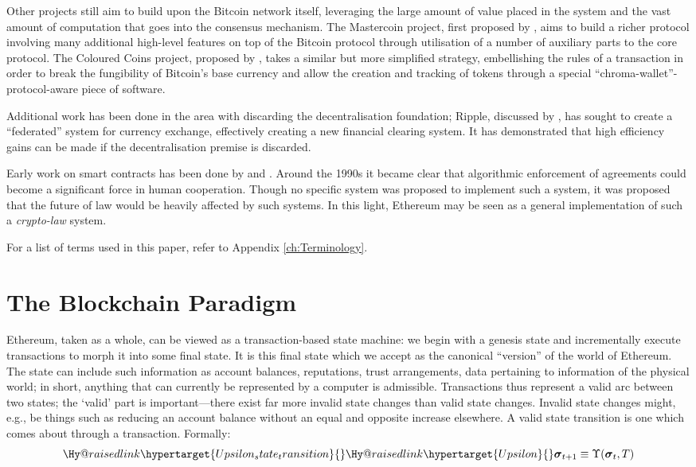 \documentclass[9pt,oneside]{amsart}
\makeatletter
\newcommand{\linkdest}[1]{\Hy@raisedlink{\hypertarget{#1}{}}}
\newcommand*\eg{e.g.\@\xspace}
\makeatother
\begin{document}
\begin{multicols}{2}
Other projects still aim to build upon the Bitcoin network itself, leveraging the large amount of value placed in the system and the vast amount of computation that goes into the consensus mechanism. The Mastercoin project, first proposed by \cite{mastercoin2013willett}, aims to build a richer protocol involving many additional high-level features on top of the Bitcoin protocol through utilisation of a number of auxiliary parts to the core protocol. The Coloured Coins project, proposed by \cite{colouredcoins2012rosenfeld}, takes a similar but more simplified strategy, embellishing the rules of a transaction in order to break the fungibility of Bitcoin's base currency and allow the creation and tracking of tokens through a special ``chroma-wallet''-protocol-aware piece of software.

Additional work has been done in the area with discarding the decentralisation foundation; Ripple, discussed by \cite{boutellier2014pirates}, has sought to create a ``federated'' system for currency exchange, effectively creating a new financial clearing system. It has demonstrated that high efficiency gains can be made if the decentralisation premise is discarded.

Early work on smart contracts has been done by \cite{szabo1997formalizing} and \cite{miller1997future}. Around the 1990s it became clear that algorithmic enforcement of agreements could become a significant force in human cooperation. Though no specific system was proposed to implement such a system, it was proposed that the future of law would be heavily affected by such systems. In this light, Ethereum may be seen as a general implementation of such a \textit{crypto-law} system.

For a list of terms used in this paper, refer to Appendix \ref{ch:Terminology}.

\section{The Blockchain Paradigm} \label{ch:overview}

Ethereum, taken as a whole, can be viewed as a transaction-based state machine: we begin with a genesis state and incrementally execute transactions to morph it into some final state. It is this final state which we accept as the canonical ``version'' of the world of Ethereum. The state can include such information as account balances, reputations, trust arrangements, data pertaining to information of the physical world; in short, anything that can currently be represented by a computer is admissible. Transactions thus represent a valid arc between two states; the `valid' part is important---there exist far more invalid state changes than valid state changes. Invalid state changes might, \eg, be things such as reducing an account balance without an equal and opposite increase elsewhere. A valid state transition is one which comes about through a transaction. Formally:
\begin{equation}
\linkdest{Upsilon_state_transition}\linkdest{Upsilon}\boldsymbol{\sigma}_{t+1} \equiv \Upsilon(\boldsymbol{\sigma}_{t}, T)
\end{equation}


\end{multicols}
\end{document}
